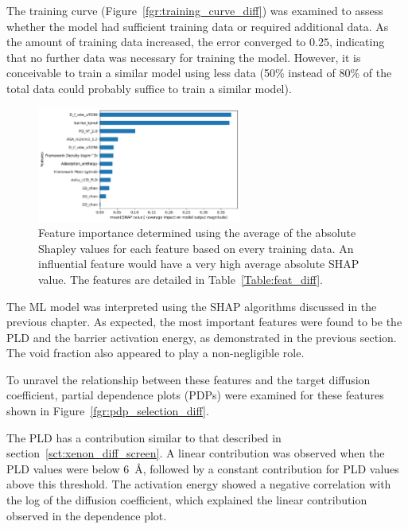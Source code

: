 \documentclass[main]{subfiles}
\begin{document}
The training curve (Figure~\ref{fgr:training_curve_diff}) was examined to assess whether the model had sufficient training data or required additional data. As the amount of training data increased, the error converged to $0.25$, indicating that no further data was necessary for training the model. However, it is conceivable to train a similar model using less data (50\% instead of 80\% of the total data could probably suffice to train a similar model). 

\begin{figure}[ht]
  \centering
  \includegraphics[width=0.6\textwidth]{figures/5-diffusion/Diff_Feature_importance_shapbased.pdf}
  \caption{ Feature importance determined using the average of the absolute Shapley values for each feature based on every training data. An influential feature would have a very high average absolute SHAP value. The features are detailed in Table~\ref{Table:feat_diff}. }\label{fgr:feat_imp_diff}
\end{figure}

The ML model was interpreted using the SHAP algorithms discussed in the previous chapter. As expected, the most important features were found to be the PLD and the barrier activation energy, as demonstrated in the previous section. The void fraction also appeared to play a non-negligible role.

To unravel the relationship between these features and the target diffusion coefficient, partial dependence plots (PDPs) were examined for these features shown in Figure~\ref{fgr:pdp_selection_diff}. 

The PLD has a contribution similar to that described in section~\ref{sct:xenon_diff_screen}. A linear contribution was observed when the PLD values were below \SI{6}{\angstrom}, followed by a constant contribution for PLD values above this threshold. The activation energy showed a negative correlation with the log of the diffusion coefficient, which explained the linear contribution observed in the dependence plot.
\end{document}
